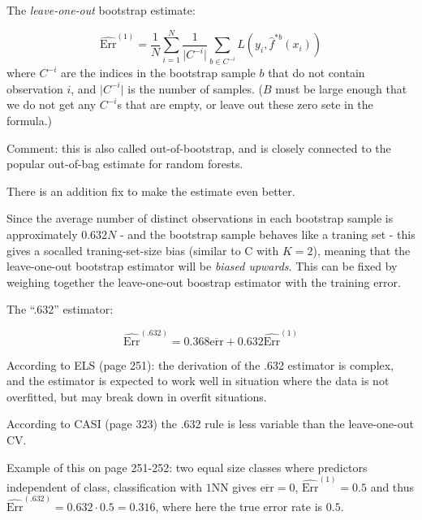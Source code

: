 \documentclass[
  ignorenonframetext,
]{beamer}
\begin{document}
\begin{frame}

The \emph{leave-one-out} bootstrap estimate:

\[\widehat{\text{Err}}^{(1)}=\frac{1}{N} \sum_{i=1}^N \frac{1}{\lvert C^{-i} \rvert} \sum_{b \in C^{-i}} L(y_i,\hat{f}^{*b}(x_i))\]
where \(C^{-i}\) are the indices in the bootstrap sample \(b\) that do
not contain observation \(i\), and \(\lvert C^{-i} \rvert\) is the
number of samples. (\(B\) must be large enough that we do not get any
\(C^{-i}\)s that are empty, or leave out these zero sete in the
formula.)

Comment: this is also called out-of-bootstrap, and is closely connected
to the popular out-of-bag estimate for random forests.

\end{frame}

\begin{frame}

There is an addition fix to make the estimate even better.

Since the average number of distinct observations in each bootstrap
sample is approximately \(0.632 N\) - and the bootstrap sample behaves
like a traning set - this gives a socalled traning-set-size bias
(similar to C with \(K=2\)), meaning that the leave-one-out bootstrap
estimator will be \emph{biased upwards}. This can be fixed by weighing
together the leave-one-out boostrap estimator with the training error.

The ``.632'' estimator:

\[\widehat{\text{Err}}^{(.632)}=0.368 \overline{\text{err}}+0.632 \widehat{\text{Err}}^{(1)}\]

According to ELS (page 251): the derivation of the .632 estimator is
complex, and the estimator is expected to work well in situation where
the data is not overfitted, but may break down in overfit situations.

According to CASI (page 323) the .632 rule is less variable than the
leave-one-out CV.

Example of this on page 251-252: two equal size classes where predictors
independent of class, classification with \(1\)NN gives
\(\overline{\text{err}}=0\), \(\widehat{\text{Err}}^{(1)}=0.5\) and thus
\(\widehat{\text{Err}}^{(.632)}=0.632\cdot 0.5=0.316\), where here the
true error rate is \(0.5\).

\end{frame}
\end{document}
